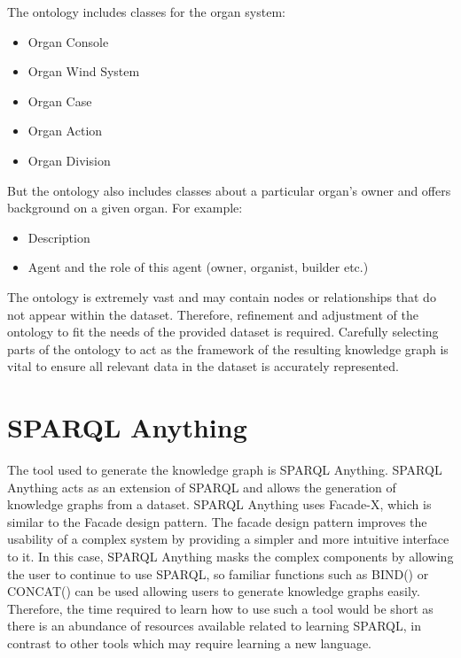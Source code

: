 The ontology includes classes for the organ system:

\vspace{-0.15cm}
\begin{itemize}
    \itemsep0em 
\item Organ Console
\vspace{-0.1cm}
\item Organ Wind System
\vspace{-0.1cm}
\item Organ Case
\vspace{-0.1cm}
\item Organ Action
\vspace{-0.1cm}
\item Organ Division
\end{itemize}
\vspace{-0.15cm}

\noindent  But the ontology also includes classes about a particular organ's owner and offers background on a given organ. For example:

\vspace{-0.15cm}
\begin{itemize}
    \itemsep0em 
\item Description
\vspace{-0.1cm}
\item Agent and the role of this agent (owner, organist, builder etc.)
\end{itemize}
\vspace{-0.15cm}

The ontology is extremely vast and may contain nodes or relationships that do not appear within the dataset. Therefore, refinement and adjustment of the ontology to fit the needs of the provided dataset is required. Carefully selecting parts of the ontology to act as the framework of the resulting knowledge graph is vital to ensure all relevant data in the dataset is accurately represented. 

\section{SPARQL Anything}
\hspace{0.5cm} The tool used to generate the knowledge graph is SPARQL Anything. SPARQL Anything acts as an extension of SPARQL and allows the generation of knowledge graphs from a dataset. SPARQL Anything uses Facade-X, which is similar to the Facade design pattern. The facade design pattern improves the usability of a complex system by providing a simpler and more intuitive interface to it. In this case, SPARQL Anything masks the complex components by allowing the user to continue to use SPARQL, so familiar functions such as BIND() or CONCAT() can be used allowing users to generate knowledge graphs easily. Therefore, the time required to learn how to use such a tool would be short as there is an abundance of resources available related to learning SPARQL, in contrast to other tools which may require learning a new language. 

